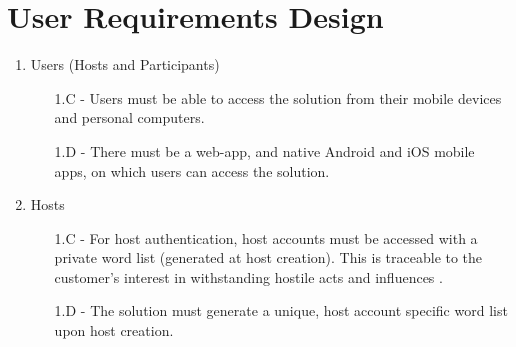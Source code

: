 \documentclass[9pt, titlepage]{extarticle}
\begin{document}
\section{User Requirements Design}

\begin{enumerate}[leftmargin=*]
 \item Users (Hosts and Participants)
 \begin{enumerate}[noitemsep, topsep=0pt, leftmargin=9mm]
 \item[1.C -] Users must be able to access the solution from their mobile devices and personal computers.
 \item[1.D -] There must be a web-app, and native Android and iOS mobile apps, on which users can access the solution.
 \end{enumerate}

 \item Hosts
 \begin{enumerate}[noitemsep, topsep=0pt, leftmargin=9mm]
 \item[1.C -] For host authentication, host accounts must be accessed with a private word list (generated at host creation). This is traceable to the customer's interest in withstanding hostile acts and influences \autocite{web:spec}.
 \item[1.D -] The solution must generate a unique, host account specific word list upon host creation.
 \end{enumerate}


\end{enumerate}
\end{document}
